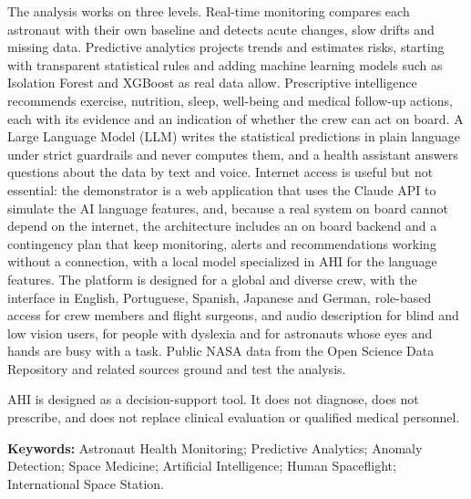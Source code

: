 The analysis works on three levels. Real-time monitoring compares each astronaut with their own baseline and detects acute changes, slow drifts and missing data. Predictive analytics projects trends and estimates risks, starting with transparent statistical rules and adding machine learning models such as Isolation Forest and XGBoost as real data allow. Prescriptive intelligence recommends exercise, nutrition, sleep, well-being and medical follow-up actions, each with its evidence and an indication of whether the crew can act on board. A Large Language Model (LLM) writes the statistical predictions in plain language under strict guardrails and never computes them, and a health assistant answers questions about the data by text and voice. Internet access is useful but not essential: the demonstrator is a web application that uses the Claude API to simulate the AI language features, and, because a real system on board cannot depend on the internet, the architecture includes an on board backend and a contingency plan that keep monitoring, alerts and recommendations working without a connection, with a local model specialized in AHI for the language features. The platform is designed for a global and diverse crew, with the interface in English, Portuguese, Spanish, Japanese and German, role-based access for crew members and flight surgeons, and audio description for blind and low vision users, for people with dyslexia and for astronauts whose eyes and hands are busy with a task. Public NASA data from the Open Science Data Repository and related sources ground and test the analysis.

AHI is designed as a decision-support tool. It does not diagnose, does not prescribe, and does not replace clinical evaluation or qualified medical personnel.

\noindent\textbf{Keywords:} Astronaut Health Monitoring; Predictive Analytics; Anomaly Detection; Space Medicine; Artificial Intelligence; Human Spaceflight; International Space Station.
